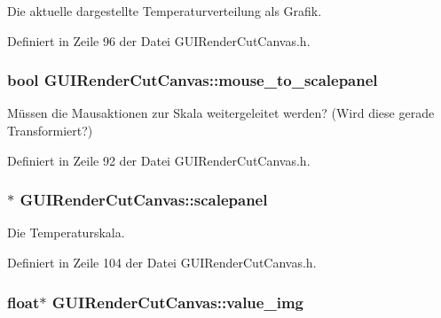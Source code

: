 Die aktuelle dargestellte Temperaturverteilung als Grafik. 



Definiert in Zeile 96 der Datei G\-U\-I\-Render\-Cut\-Canvas.\-h.

\hypertarget{classGUIRenderCutCanvas_a67247191a5442c586d32c9ef6cb1df2e}{
\subsubsection[{mouse\-\_\-to\-\_\-scalepanel}]{\setlength{\rightskip}{0pt plus 5cm}bool G\-U\-I\-Render\-Cut\-Canvas\-::mouse\-\_\-to\-\_\-scalepanel\hspace{0.3cm}{\ttfamily [private]}}}\label{classGUIRenderCutCanvas_a67247191a5442c586d32c9ef6cb1df2e}


Müssen die Mausaktionen zur Skala weitergeleitet werden? (Wird diese gerade Transformiert?) 



Definiert in Zeile 92 der Datei G\-U\-I\-Render\-Cut\-Canvas.\-h.

\hypertarget{classGUIRenderCutCanvas_a775d88069fbba36582815b477f929632}{
\subsubsection[{scalepanel}]{$\ast$ G\-U\-I\-Render\-Cut\-Canvas\-::scalepanel\hspace{0.3cm}{\ttfamily [private]}}}\label{classGUIRenderCutCanvas_a775d88069fbba36582815b477f929632}


Die Temperaturskala. 



Definiert in Zeile 104 der Datei G\-U\-I\-Render\-Cut\-Canvas.\-h.

\hypertarget{classGUIRenderCutCanvas_ad5a1f8cc7bd80e3c5a1fde354f0506b0}{
\subsubsection[{value\-\_\-img}]{\setlength{\rightskip}{0pt plus 5cm}float$\ast$ G\-U\-I\-Render\-Cut\-Canvas\-::value\-\_\-img\hspace{0.3cm}{\ttfamily [private]}}}\label{classGUIRenderCutCanvas_ad5a1f8cc7bd80e3c5a1fde354f0506b0}


